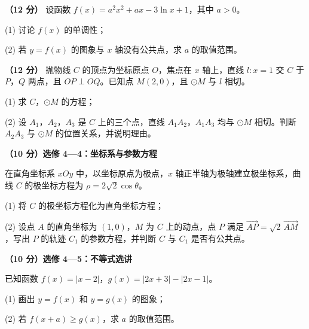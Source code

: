 \begin{question}
\textbf{（12 分）} 设函数 $f(x)=a^{2}x^{2}+ax-3\ln x+1$，其中 $a>0$。

  (1) 讨论 $f(x)$ 的单调性；

  (2) 若 $y=f(x)$ 的图象与 $x$ 轴没有公共点，求 $a$ 的取值范围。

\end{question}
\begin{question}
\textbf{（12 分）} 抛物线 $C$ 的顶点为坐标原点 $O$，焦点在 $x$ 轴上，直线 $l:x=1$ 交 $C$ 于 $P$，$Q$ 两点，且 $OP\perp OQ$。已知点 $M(2,0)$，且 $\odot M$ 与 $l$ 相切。

  (1) 求 $C$，$\odot M$ 的方程；

  (2) 设 $A_1$，$A_2$，$A_3$ 是 $C$ 上的三个点，直线 $A_1A_2$，$A_1A_3$ 均与 $\odot M$ 相切。判断 $A_2A_3$ 与 $\odot M$ 的位置关系，并说明理由。

\end{question}

\begin{question}
\textbf{（10 分）选修 4—4：坐标系与参数方程} 

在直角坐标系 $xOy$ 中，以坐标原点为极点，$x$ 轴正半轴为极轴建立极坐标系，曲线 $C$ 的极坐标方程为 $\rho=2\sqrt2\cos\theta$。

  (1) 将 $C$ 的极坐标方程化为直角坐标方程；

  (2) 设点 $A$ 的直角坐标为 $(1,0)$，$M$ 为 $C$ 上的动点，点 $P$ 满足 $\overrightarrow{AP}=\sqrt2\,\overrightarrow{AM}$，写出 $P$ 的轨迹 $C_1$ 的参数方程，并判断 $C$ 与 $C_1$ 是否有公共点。

\Needspace{0.4\textheight}
\end{question}
\begin{question}
\textbf{（10 分）选修 4—5：不等式选讲} 

已知函数 $f(x)=|x-2|$，$g(x)=|2x+3|-|2x-1|$。
\nopagebreak[4]
\begin{center}\end{center}
\nopagebreak[4]
  (1) 画出 $y=f(x)$ 和 $y=g(x)$ 的图象；

  (2) 若 $f(x+a)\geqslant g(x)$，求 $a$ 的取值范围。

\end{question}